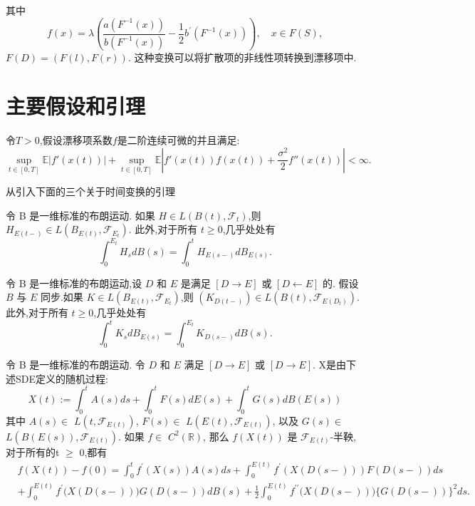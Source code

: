 其中
$$f(x)=\lambda\left(\frac{a(F^{-1}(x))}{b(F^{-1}(x))}-\frac12b^{\prime}(F^{-1}(x))\right),\quad x\in F(S),$$
$F(D)=(F(l),F(r)).$ 这种变换可以将扩散项的非线性项转换到漂移项中.

\section{主要假设和引理}

\begin{assumption}\label{moment}
	令$T>0$,假设漂移项系数$f$是二阶连续可微的并且满足:
	\begin{equation}
		\sup\limits_{t\in[0,T]}\mathbb{E}\left|f'(x(t))\right|+
		\sup\limits_{t\in[0,T]}\mathbb{E}\left|f'(x(t))f(x(t))+
		\frac{\sigma^2}2f''(x(t))\right|<\infty.
	\end{equation}
\end{assumption}


从\cite{umarov2018beyond}引入下面的三个关于时间变换的引理
\begin{lemma}[第一变量变换公式]\label{first}
	令 B 是一维标准的布朗运动.
	如果 $H \in L(B(t), \mathcal{F}_t)$,则 $H_{E(t-)} \in L(B_{E(t)}, \mathcal{F}_{E_t})$.
	此外,对于所有 $t \geqslant 0$,几乎处处有
	$$
	\int_0^{E_t} H_s dB(s) = \int_0^t H_{E(s-)} dB_{E(s)}.
	$$
\end{lemma}
\begin{lemma}[第二变量变换公式]\label{second}
	令 B 是一维标准的布朗运动,设 $D$ 和 $E$ 是满足 $[D \longrightarrow E]$ 或 $[D \longleftarrow E]$ 的.
	假设 $B$ 与 $E$ 同步.如果 $K \in L(B_{E(t)}, \mathcal{F}_{E_t})$,则 $(K_{D(t-)}) \in L(B(t), \mathcal{F}_{E(D_t)})$.
	此外,对于所有 $t \geqslant 0$,几乎处处有
	$$
	\int_0^t K_s dB_{E(s)} = \int_0^{E_t} K_{D(s-)} dB(s).
	$$
\end{lemma}

\begin{lemma}[It\^{o}公式]\label{ito}
	令 B 是一维标准的布朗运动. 令 $D$ 和 $E$ 满足 $[  D\longrightarrow E ]$ 或 $[  D\longrightarrow E ] .$ X是由下述SDE定义的随机过程:
	$$X(t):=\int_0^tA(s)ds+\int_0^tF(s)dE(s)+\int_0^tG(s)dB(E(s))$$
	其中 $A(s)\in$ $L( t, \mathcal{F} _{E(t)})$, $F(s)\in$ $L( E(t), \mathcal{F} _{E(t)})$, 以及 $G(s)\in$ $L( B(E(s)), \mathcal{F} _{E(t)}) .$ 如果 $f\in$ $C^2( \mathbb{R} )$, 那么
	$f(X(t))$ 是 $\mathcal{F}_{E(t)}$-半鞅, 对于所有的t $\ge$ 0,都有
	$$\begin{aligned}
		&f(X(t))-f(0)=\int_{0}^{t}f^{\prime}(X(s))A(s)ds+\int_{0}^{E(t)}f^{\prime}\left(X(D(s-))\right)F(D(s-))ds\\
		&+\int_{0}^{E(t)}f^{\prime}\big(X(D(s-))\big)G(D(s-))dB(s)+\frac{1}{2}\int_{0}^{E(t)}f^{\prime\prime}\big(X(D(s-))\big)\big\{G(D(s-))\big\}^{2}ds.
	\end{aligned}$$
\end{lemma}


